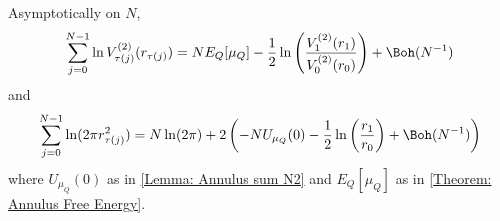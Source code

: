 \begin{lema}	\label{Lemma: Annulus Sum 1/2}
		Asymptotically on $N$,
		\begin{equation}
		\sum_{j=0}^{N-1}  \ln V^{(2)}_{\tau(j)}(r_{\tau(j)})  = N E_Q[\mu_Q] -   \frac{1}{2} \ln \left( \frac{V^{(2)}_{1}(r_1)}{V^{(2)}_{0}(r_{0})} \right) + \Boh(N^{-1})
		\label{Equation: logV annulus}
	\end{equation}
	and
	\begin{equation}
		\sum_{j=0}^{N-1}  \ln(2\pi r^2_{\tau(j)}) = N \ln(2\pi) + 2 \left( - N U_{\mu_Q}(0) - \frac{1}{2} \ln\left(\frac{r_1}{r_0}\right) + \Boh(N^{-1}) \right) 
		\label{Equation: log(r) annulus}
	\end{equation}
	where $U_{\mu_Q}(0)$ as in \autoref{Lemma: Annulus sum N2} and $	E_Q[\mu_Q]$ as in \autoref{Theorem: Annulus Free Energy}.
\end{lema}

